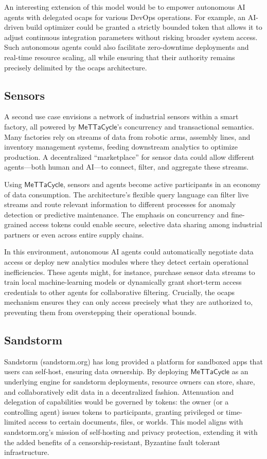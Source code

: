 \documentclass{article}
\newcommand{\MC}{\mathsf{MeTTaCycle}}
\begin{document}
An interesting extension of this model would be to empower autonomous
AI agents with delegated ocaps for various DevOps operations. For
example, an AI-driven build optimizer could be granted a strictly
bounded token that allows it to adjust continuous integration
parameters without risking broader system access. Such autonomous
agents could also facilitate zero-downtime deployments and real-time
resource scaling, all while ensuring that their authority remains
precisely delimited by the ocaps architecture.

\subsection{Sensors}

A second use case envisions a network of industrial sensors within a
smart factory, all powered by $\MC$'s concurrency and transactional
semantics. Many factories rely on streams of data from robotic arms,
assembly lines, and inventory management systems, feeding downstream
analytics to optimize production. A decentralized “marketplace” for
sensor data could allow different agents---both human and AI---to
connect, filter, and aggregate these streams.

Using $\MC$, sensors and agents become active participants in an
economy of data consumption. The architecture’s flexible query
language can filter live streams and route relevant information to
different processes for anomaly detection or predictive
maintenance. The emphasis on concurrency and fine-grained access
tokens could enable secure, selective data sharing among industrial
partners or even across entire supply chains.

In this environment, autonomous AI agents could automatically
negotiate data access or deploy new analytics modules where they
detect certain operational inefficiencies. These agents might, for
instance, purchase sensor data streams to train local machine-learning
models or dynamically grant short-term access credentials to other
agents for collaborative filtering. Crucially, the ocaps mechanism
ensures they can only access precisely what they are authorized to,
preventing them from overstepping their operational bounds.

\subsection{Sandstorm}

Sandstorm (sandstorm.org) has long provided a platform for sandboxed
apps that users can self-host, ensuring data ownership. By deploying
$\MC$ as an underlying engine for sandstorm deployments, resource
owners can store, share, and collaboratively edit data in a
decentralized fashion. Attenuation and delegation of capabilities
would be governed by tokens: the owner (or a controlling agent) issues
tokens to participants, granting privileged or time-limited access to
certain documents, files, or worlds. This model aligns with
sandstorm.org’s mission of self-hosting and privacy protection,
extending it with the added benefits of a censorship-resistant,
Byzantine fault tolerant infrastructure.
\end{document}
